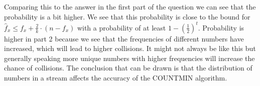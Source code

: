 \documentclass{article}
\begin{document}
\noindent Comparing this to the answer in the first part of the question we can see that the probability is a bit higher. We see that this probability is close to the bound for \(\hat{f}_x \leq f_x + \frac{2}{k} \cdot (n - f_x)\) with a probability of at least \(1-\left(\frac{1}{2}\right)^t\). Probability is higher in part 2 because we see that the frequencies of different numbers have increased, which will lead to higher collisions. It might not always be like this but generally speaking more unique numbers with higher frequencies will increase the chance of collisions. The conclusion that can be drawn is that the distribution of numbers in a stream affects the accuracy of the COUNTMIN algorithm.

\newpage


\end{document}
